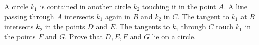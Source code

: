 A circle $k_1$ is contained in another circle $k_2$ touching it in the point $A$.
A line passing through $A$ intersects $k_1$ again in $B$ and $k_2$ in $C$.
The tangent to $k_1$ at $B$ intersects $k_2$ in the points $D$ and $E$.
The tangents to $k_1$ through $C$ touch $k_1$ in the points $F$ and $G$.
Prove that $D,E,F$ and $G$ lie on a circle.